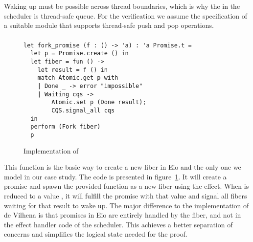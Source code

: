 Waking up must be possible across thread boundaries, which is why the  in the scheduler is thread-safe queue.
For the verification we assume the specification of a suitable  module that supports thread-safe push and pop operations.


\subsubsection{}
\label{sec:sched-impl-fork}

\begin{figure}[ht]
  \begin{verbatim}
let fork_promise (f : () -> 'a) : 'a Promise.t =
  let p = Promise.create () in
  let fiber = fun () ->
    let result = f () in
    match Atomic.get p with
    | Done _ -> error "impossible"
    | Waiting cqs ->
        Atomic.set p (Done result);
        CQS.signal_all cqs 
  in
  perform (Fork fiber) 
  p
  \end{verbatim}
  \caption{Implementation of }
  \label{fig:sched-impl-fork}
\end{figure}


This function is the basic way to create a new fiber in Eio and the only one we model in our case study.
The code is presented in figure~\ref{fig:sched-impl-fork}.
It will create a promise and spawn the provided function as a new fiber using the \efork{} effect.
When  is reduced to a value , it will fulfill the promise with that value and signal all fibers waiting for that result to wake up.
The major difference to the implementation of de Vilhena is that promises in Eio are entirely handled by the fiber, and not in the effect handler code of the scheduler.
This achieves a better separation of concerns and simplifies the logical state needed for the proof.

\subsubsection{}
\label{sec:sched-impl-await}

